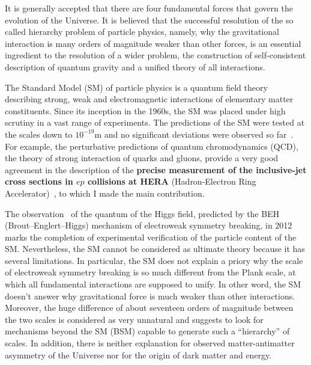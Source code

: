 It is generally accepted that there are four fundamental forces that govern the evolution of the Universe. It is believed that the successful resolution of the so called hierarchy problem of particle physics, namely, why the gravitational interaction is many orders of magnitude weaker than other forces, is an essential ingredient to the resolution of a wider problem, the construction of self-consistent description of quantum gravity and a unified theory of all interactions.

The Standard Model (SM) of particle physics is a quantum field theory describing strong, weak and electromagnetic interactions of elementary matter constituents. Since its inception in the 1960s, the SM was placed under high scrutiny in a vast range of experiments. The predictions of the SM were tested at the scales down to $10^{-19}$m and no significant deviations were observed so far~\cite{Agashe:2014kda}. For example, the perturbative predictions of quantum chromodynamics (QCD), the theory of strong interaction of quarks and gluons, provide a very good agreement in the description of the \textbf{precise measurement of the inclusive-jet cross sections in $ep$ collisions at HERA} (Hadron-Electron Ring Accelerator)~\cite{Abramowicz:2012jz}, to which I made the main contribution. 

The observation~\cite{Aad:2012tfa,Chatrchyan:2012xdj} of the quantum of the Higgs field, predicted by the BEH (Brout--Englert--Higgs) mechanism of electroweak symmetry breaking, in 2012 marks the completion of experimental verification of the particle content of the SM. Nevertheless, the SM cannot be considered as ultimate theory because it has several limitations. In particular, the SM does not explain a priory why the scale of electroweak symmetry breaking is so much different from the Plank scale, at which all fundamental interactions are supposed to unify. In other word, the SM doesn't answer why gravitational force is much weaker than other interactions. Moreover, the huge difference of about seventeen orders of magnitude between the two scales is considered as very unnatural and suggests to look for mechanisms beyond the SM (BSM) capable to generate such a ``hierarchy'' of scales. In addition, there is neither explanation for observed matter-antimatter asymmetry of the Universe nor for the origin of dark matter and energy.

